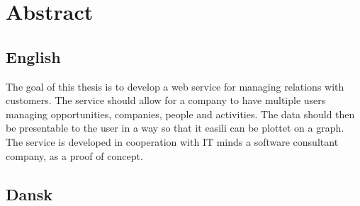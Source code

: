 \chapter{Abstract}
\label{chap:Abstract}

\section*{English}
The goal of this thesis is to develop a web service for managing relations with
customers. The service should allow for a company to have multiple users
managing opportunities, companies, people and activities. The data should then
be presentable to the user in a way so that it easili can be plottet on a graph.
The service is developed in cooperation with IT minds a software consultant
company, as a proof of concept.

\section*{Dansk}
